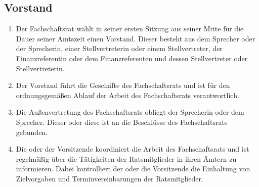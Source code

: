 \subsection{Vorstand}
\begin{enumerate}
\item Der Fachschaftsrat wählt in seiner ersten Sitzung aus seiner Mitte für die Dauer seiner Amtszeit einen Vorstand. Dieser besteht aus dem Sprecher oder der Sprecherin, einer Stellvertreterin oder einem Stellvertreter, der Finanzreferentin oder dem Finanzreferenten und dessen Stellvertreter oder Stellvertreterin.
\item Der Vorstand führt die Geschäfte des Fachschaftsrats und ist für den ordnungsgemäßen Ablauf der Arbeit des Fachschaftsrats verantwortlich.
\item Die Außenvertretung des Fachschaftsrats obliegt der Sprecherin oder dem Sprecher. Dieser oder diese ist an die Beschlüsse des Fachschaftsrats gebunden.
\item Die oder der Vorsitzende koordiniert die Arbeit des Fachschaftsrats und ist regelmäßig über die Tätigkeiten der Ratsmitglieder in ihren Ämtern zu informieren. Dabei kontrolliert der oder die Vorsitzende die Einhaltung von Zielvorgaben und Terminvereinbarungen der Ratsmitglieder.
\end{enumerate}

